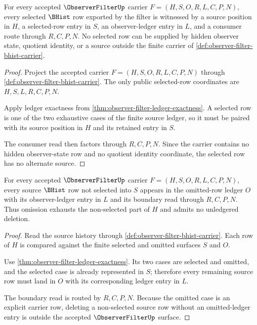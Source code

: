 \begin{theorem}
\label{thm:observer-filter-selected-row-totality}
For every accepted $\ObserverFilterUp$ carrier $F=(H,S,O,R,L,C,P,N)$, every selected $\BHist$ row exported by the filter is witnessed by a source position in $H$, a selected-row entry in $S$, an observer-ledger entry in $L$, and a consumer route through $R,C,P,N$. No selected row can be supplied by hidden observer state, quotient identity, or a source outside the finite carrier of \autoref{def:observer-filter-bhist-carrier}.
\end{theorem}
\begin{proof}
Project the accepted carrier $F=(H,S,O,R,L,C,P,N)$ through \autoref{def:observer-filter-bhist-carrier}. The only public selected-row coordinates are $H,S,L,R,C,P,N$.

Apply ledger exactness from \autoref{thm:observer-filter-ledger-exactness}. A selected row is one of the two exhaustive cases of the finite source ledger, so it must be paired with its source position in $H$ and its retained entry in $S$.

The consumer read then factors through $R,C,P,N$. Since the carrier contains no hidden observer-state row and no quotient identity coordinate, the selected row has no alternate source.
\end{proof}

\begin{theorem}
\label{thm:observer-filter-omitted-row-boundary-exhaustion}
For every accepted $\ObserverFilterUp$ carrier $F=(H,S,O,R,L,C,P,N)$, every source $\BHist$ row not selected into $S$ appears in the omitted-row ledger $O$ with its observer-ledger entry in $L$ and its boundary read through $R,C,P,N$. Thus omission exhausts the non-selected part of $H$ and admits no unledgered deletion.
\end{theorem}
\begin{proof}
Read the source history through \autoref{def:observer-filter-bhist-carrier}. Each row of $H$ is compared against the finite selected and omitted surfaces $S$ and $O$.

Use \autoref{thm:observer-filter-ledger-exactness}. Its two cases are selected and omitted, and the selected case is already represented in $S$; therefore every remaining source row must land in $O$ with its corresponding ledger entry in $L$.

The boundary read is routed by $R,C,P,N$. Because the omitted case is an explicit carrier row, deleting a non-selected source row without an omitted-ledger entry is outside the accepted $\ObserverFilterUp$ surface.
\end{proof}

